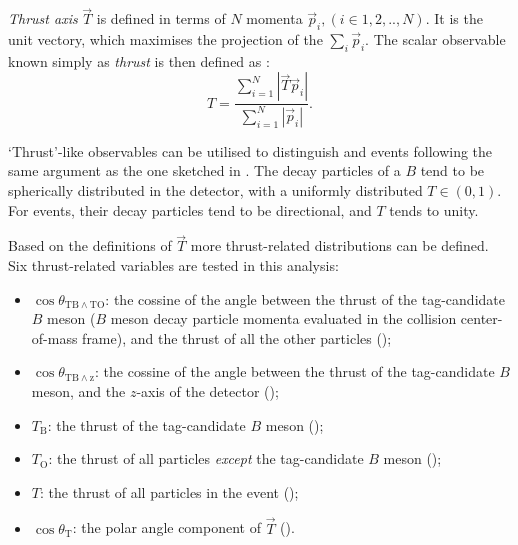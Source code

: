 \textit{Thrust axis} $\vec{T}$ is defined in terms of $N$ momenta $\vec{p}_i,(i\in{1,2,..,N})$.
It is the unit vectory, which maximises the projection of the $\sum_i\vec{p}_i$.
The scalar observable known simply as \textit{thrust} is then defined as \cite{BaBar:2014omp}:
\begin{equation}\label{eq:thrust}
    T = \frac{\sum^N_{i=1}|\vec{T}\vec{p}_i|}{\sum^N_{i=1}|\vec{p}_i|}.
\end{equation}

`Thrust'-like observables can be utilised to distinguish \epem\ra\qqbar and \BtoXsgamma events following the same argument as the one sketched in .
The decay particles of a $B$ tend to be spherically distributed in the detector, with a uniformly distributed $T\in(0,1)$.
For \qqbar events, their decay particles tend to be directional, and $T$ tends to unity.

Based on the definitions of $\vec{T}$ more thrust-related distributions can be defined.
Six thrust-related variables are tested in this analysis:
\begin{itemize}
    \item $\cos\theta_{\mathrm{TB}\wedge\mathrm{TO}}$: the cossine of the angle between the thrust of the tag-candidate $B$ meson ($B$ meson decay particle momenta evaluated in the collision center-of-mass frame),
    and the thrust of all the other particles ();
    \item $\cos\theta_{\mathrm{TB}\wedge\mathrm{z}}$: the cossine of the angle between the thrust of the tag-candidate $B$ meson,
    and the $z$-axis of the detector ();
    \item $T_{\mathrm{B}}$: the thrust of the tag-candidate $B$ meson ();
    \item $T_{\mathrm{O}}$: the thrust of all particles \textit{except} the tag-candidate $B$ meson ();
    \item $T$: the thrust of all particles in the event ();
    \item $\cos\theta_{\mathrm{T}}$: the polar angle component of $\vec{T}$ ().
\end{itemize}

